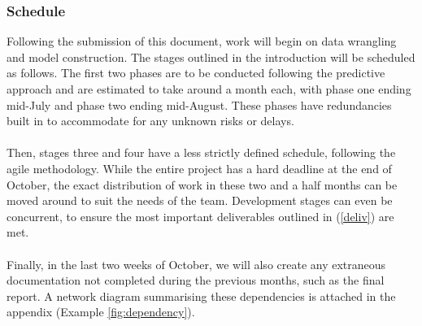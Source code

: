 \documentclass[a4paper, 12pt]{article}
\begin{document}
        \subsubsection{Schedule}
        Following the submission of this document, work will begin on data wrangling and model construction. The stages outlined in the introduction will be scheduled as follows.
        The first two phases are to be conducted following the predictive approach and are estimated to take around a month each, with phase one ending mid-July and phase two ending mid-August. These phases have redundancies built in to accommodate for any unknown risks or delays. 
        \\\\
        Then, stages three and four have a less strictly defined schedule, following the agile methodology. While the entire project has a hard deadline at the end of October, the exact distribution of work in these two and a half months can be moved around to suit the needs of the team. Development stages can even be concurrent, to ensure the most important deliverables outlined in (\ref{deliv}) are met.
        \\\\
        Finally, in the last two weeks of October, we will also create any extraneous documentation not completed during the previous months, such as the final report. A network diagram summarising these dependencies is attached in the appendix (Example \ref{fig:dependency}).
\end{document}
